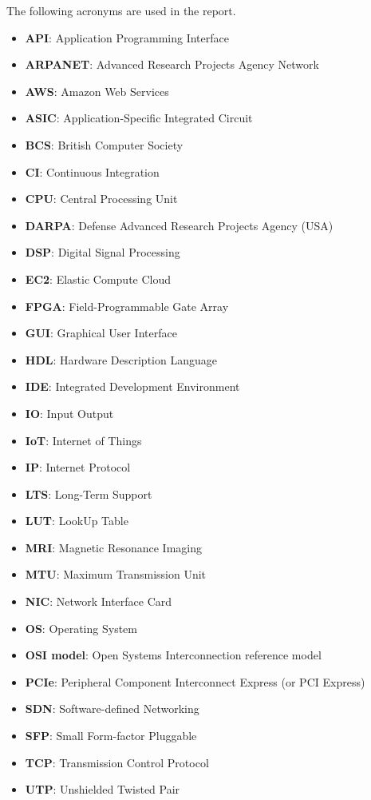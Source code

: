 The following acronyms are used in the report.
\begin{itemize}
  \item \textbf{API}: Application Programming Interface
  \item \textbf{ARPANET}: Advanced Research Projects Agency Network
  \item \textbf{AWS}: Amazon Web Services
  \item \textbf{ASIC}: Application-Specific Integrated Circuit
  \item \textbf{BCS}: British Computer Society
  \item \textbf{CI}: Continuous Integration
  \item \textbf{CPU}: Central Processing Unit
  \item \textbf{DARPA}: Defense Advanced Research Projects Agency (USA)
  \item \textbf{DSP}: Digital Signal Processing
  \item \textbf{EC2}: Elastic Compute Cloud
  \item \textbf{FPGA}: Field-Programmable Gate Array
  \item \textbf{GUI}: Graphical User Interface
  \item \textbf{HDL}: Hardware Description Language
  \item \textbf{IDE}: Integrated Development Environment
  \item \textbf{IO}: Input Output
  \item \textbf{IoT}: Internet of Things
  \item \textbf{IP}: Internet Protocol
  \item \textbf{LTS}: Long-Term Support
  \item \textbf{LUT}: LookUp Table
  \item \textbf{MRI}: Magnetic Resonance Imaging
  \item \textbf{MTU}: Maximum Transmission Unit
  \item \textbf{NIC}: Network Interface Card
  \item \textbf{OS}: Operating System
  \item \textbf{OSI model}: Open Systems Interconnection reference model
  \item \textbf{PCIe}: Peripheral Component Interconnect Express (or PCI Express)
  \item \textbf{SDN}: Software-defined Networking
  \item \textbf{SFP}: Small Form-factor Pluggable
  \item \textbf{TCP}: Transmission Control Protocol
  \item \textbf{UTP}: Unshielded Twisted Pair
\end{itemize}
